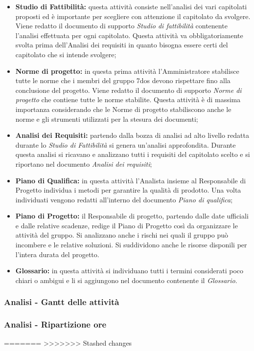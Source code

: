 \begin{itemize}

	\item \textbf{Studio di Fattibilità:} questa attività consiste nell'analisi dei vari capitolati proposti ed è importante per scegliere con attenzione il capitolato da svolgere. Viene redatto il documento di supporto \textit{Studio di fattibilità} contenente l'analisi effettuata per ogni capitolato. Questa attività va obbligatoriamente svolta prima dell'Analisi dei requisiti in quanto bisogna essere certi del capitolato che si intende svolgere;

	\item \textbf{Norme di progetto:} in questa prima attività l'Amministratore stabilisce tutte le norme che i membri del gruppo 7dos devono rispettare fino alla conclusione del progetto. Viene redatto il documento di supporto \textit{Norme di progetto} che contiene tutte le norme stabilite. Questa attività è di massima importanza considerando che le Norme di progetto stabiliscono anche le norme e gli strumenti utilizzati per la stesura dei documenti;

	\item \textbf{Analisi dei Requisiti:} partendo dalla bozza di analisi ad alto livello redatta durante lo \textit{Studio di Fattibilità} si genera un'analisi approfondita. Durante questa analisi si ricavano e analizzano tutti i requisiti del capitolato scelto e si riportano nel documento \textit{Analisi dei requisiti};

	\item \textbf{Piano di Qualifica:} in questa attività l'Analista insieme al Responsabile di Progetto individua i metodi per garantire la qualità di prodotto. Una volta individuati vengono redatti all'interno del documento \textit{Piano di qualifica};

	\item \textbf{Piano di Progetto:} il Responsabile di progetto, partendo dalle date ufficiali e dalle relative scadenze, redige il Piano di Progetto così da organizzare le attività del gruppo. Si analizzano anche i rischi nei quali il gruppo può incombere e le relative soluzioni. Si suddividono anche le risorse disponili per l'intera durata del progetto.

	\item \textbf{Glossario:} in questa attività si individuano tutti i termini considerati poco chiari o ambigui e li si aggiungono nel documento contenente il \textit{Glossario}.

\end{itemize}

\subsubsection{Analisi - Gantt delle attività}

\subsubsection{Analisi - Ripartizione ore}
=======
\pagebreak
>>>>>>> Stashed changes
